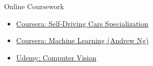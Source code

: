 



{\large\color{emphasis}Online Coursework\par}
\smallskip
\begin{itemize}
\item \href{https://www.coursera.org/specializations/self-driving-cars}{Coursera: Self-Driving Cars Specialization}
\item \href{https://www.coursera.org/account/accomplishments/records/AELG6KXXJ88V}{Coursera: Machine Learning (Andrew Ng)}
\item \href{https://www.udemy.com/certificate/UC-TJRJ90AG/}{Udemy: Computer Vision}
\end{itemize}

